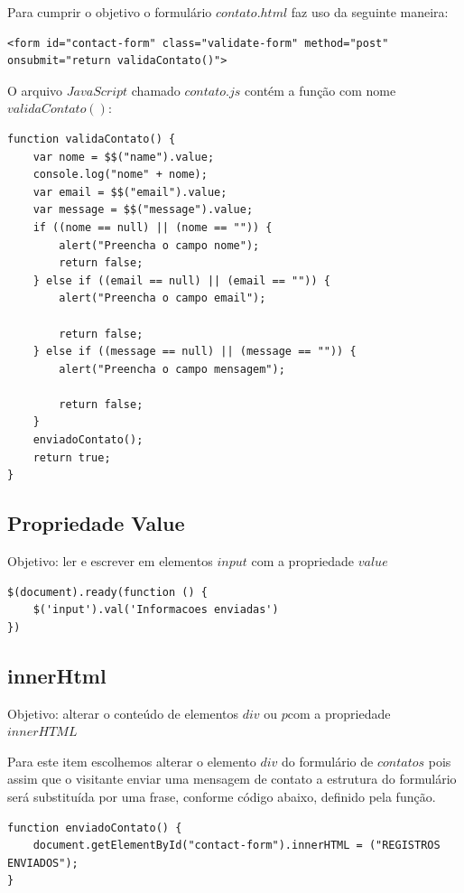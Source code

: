 	Para cumprir o objetivo o formulário $contato.html$ faz uso da seguinte maneira:
\begin{lstlisting}
<form id="contact-form" class="validate-form" method="post" onsubmit="return validaContato()">
\end{lstlisting}

	O arquivo $JavaScript$ chamado $contato.js$ contém a função com nome $validaContato()$:
\begin{lstlisting}
function validaContato() {
    var nome = $$("name").value;
    console.log("nome" + nome);
    var email = $$("email").value;
    var message = $$("message").value;
    if ((nome == null) || (nome == "")) {
        alert("Preencha o campo nome");
        return false;
    } else if ((email == null) || (email == "")) {
        alert("Preencha o campo email");

        return false;
    } else if ((message == null) || (message == "")) {
        alert("Preencha o campo mensagem");

        return false;
    }
    enviadoContato();
    return true;
}
\end{lstlisting}
	

\subsection{Propriedade Value}
	Objetivo: ler e escrever em elementos $input$ com a propriedade $value$
	
\begin{lstlisting}
$(document).ready(function () {
    $('input').val('Informacoes enviadas')
})
\end{lstlisting}


\subsection{innerHtml}
	Objetivo: alterar o conteúdo de elementos $div$ ou $p$com a propriedade $innerHTML$
	
	Para este item escolhemos alterar o elemento $div$ do formulário de $contatos$ pois assim que o visitante enviar uma mensagem de contato a estrutura do formulário será substituída por uma frase, conforme código abaixo, definido pela função.

\begin{lstlisting}
function enviadoContato() {
    document.getElementById("contact-form").innerHTML = ("REGISTROS ENVIADOS");
}
\end{lstlisting}


